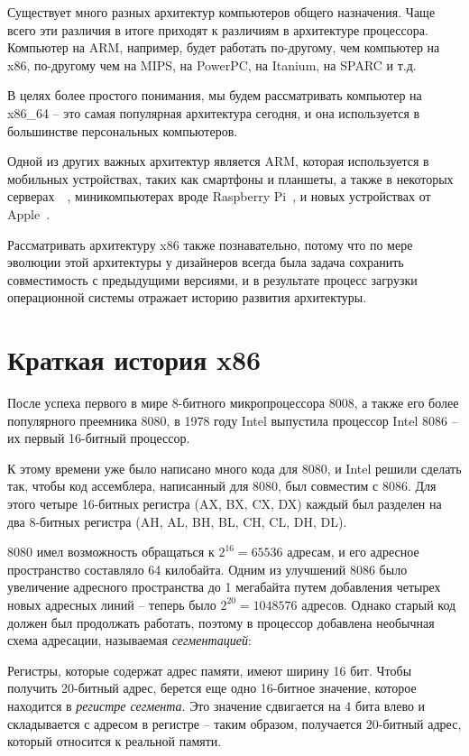 \documentclass[a4page]{article}
\begin{document}
Существует много разных архитектур компьютеров общего назначения.
Чаще всего эти различия в итоге приходят к различиям в архитектуре процессора.
Компьютер на ARM, например, будет работать по-другому, чем компьютер на x86, 
по-другому чем на MIPS, на PowerPC, на Itanium, на SPARC и т.д.

В целях более простого понимания, мы будем рассматривать компьютер на x86\_64 -- 
это самая популярная архитектура сегодня, и она используется в большинстве
персональных компьютеров.

Одной из других важных архитектур является ARM,
которая используется в мобильных устройствах, таких как смартфоны и планшеты,
а также в некоторых серверах~\cite{web:awsarminst}~\cite{web:awsarmpartners}, миникомпьютерах вроде Raspberry Pi~\cite{web:rpiprocessor},
и новых устройствах от Apple~\cite{enwiki:1114570840}.

Рассматривать архитектуру x86 также познавательно, потому что по мере эволюции
этой архитектуры у дизайнеров всегда была задача сохранить совместимость с
предыдущими версиями, и в результате процесс загрузки операционной системы
отражает историю развития архитектуры.

\section{Краткая история x86}

После успеха первого в мире 8-битного микропроцессора 8008,
а также его более популярного преемника 8080,
в 1978 году Intel выпустила процессор Intel 8086 -- их первый 16-битный процессор.

К этому времени уже было написано много кода для 8080,
и Intel решили сделать так, чтобы код ассемблера, написанный для 8080,
был совместим с 8086.
Для этого четыре 16-битных регистра (AX, BX, CX, DX)
каждый был разделен на два 8-битных регистра (AH, AL, BH, BL, CH, CL, DH, DL).

8080 имел возможность обращаться к $2^{16}=65536$ адресам,
и его адресное пространство составляло 64 килобайта.
Одним из улучшений 8086 было увеличение адресного пространства до 1 мегабайта
путем добавления четырех новых адресных линий --
теперь было $2^{20}=1048576$ адресов.
Однако старый код должен был продолжать работать,
поэтому в процессор добавлена необычная схема адресации, называемая \emph{сегментацией}:

Регистры, которые содержат адрес памяти, имеют ширину 16 бит.
Чтобы получить 20-битный адрес,
берется еще одно 16-битное значение, которое находится в \emph{регистре сегмента}.
Это значение сдвигается на 4 бита влево и складывается с адресом в регистре --
таким образом, получается 20-битный адрес, который относится к реальной памяти.
\end{document}
